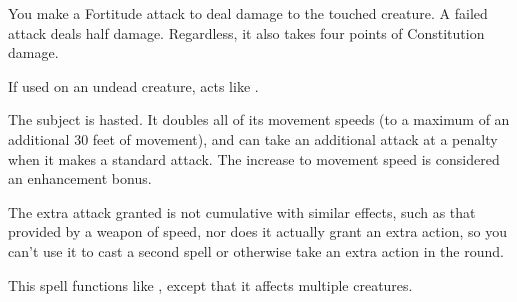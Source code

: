 \spellrng{\rngtouch}
\begin{spelleffect}
    You make a Fortitude attack to deal damage to the touched creature. A failed attack deals half damage. Regardless, it also takes four points of Constitution damage.
\end{spelleffect}
\begin{spellnotes}
  If used on an undead creature,  acts like .
\end{spellnotes}

\spelldur{\durshort}
\begin{spelleffect}
  The subject is hasted. It doubles all of its movement speeds (to a maximum of an additional 30 feet of movement), and can take an additional attack at a  penalty when it makes a standard attack. The increase to movement speed is considered an enhancement bonus.
\end{spelleffect}
\begin{spellnotes}
    The extra attack granted is not cumulative with similar effects, such as that provided by a weapon of speed, nor does it actually grant an extra action, so you can't use it to cast a second spell or otherwise take an extra action in the round.
\end{spellnotes}

\begin{spelleffect}
  This spell functions like , except that it affects multiple creatures.
\end{spelleffect}

